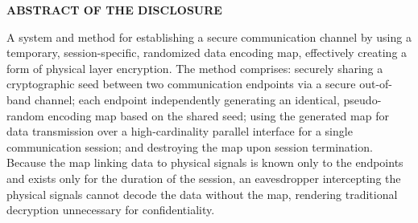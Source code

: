\documentclass[11pt,letterpaper]{article}
\begin{document}
\thispagestyle{empty}

\begin{center}
    \textbf{\large ABSTRACT OF THE DISCLOSURE}
\end{center}

\vspace{0.6cm}

A system and method for establishing a secure communication channel by using a temporary, session-specific, randomized data encoding map, effectively creating a form of physical layer encryption. The method comprises: securely sharing a cryptographic seed between two communication endpoints via a secure out-of-band channel; each endpoint independently generating an identical, pseudo-random encoding map based on the shared seed; using the generated map for data transmission over a high-cardinality parallel interface for a single communication session; and destroying the map upon session termination. Because the map linking data to physical signals is known only to the endpoints and exists only for the duration of the session, an eavesdropper intercepting the physical signals cannot decode the data without the map, rendering traditional decryption unnecessary for confidentiality.
\end{document}
